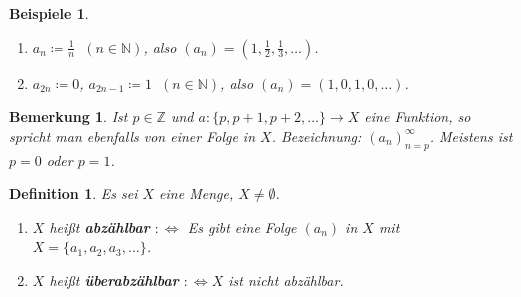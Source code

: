\documentclass[12pt]{extreport} %
\newcommand{\N}{\mathbb{N}}
\newcommand{\Z}{\mathbb{Z}}
\theoremstyle{named}
\theoremstyle{itshape}
\newtheorem*{definition}{Definition}
\theoremstyle{normal}
\newtheorem*{beispiele}{Beispiele}
\newtheorem*{bemerkung}{Bemerkung}
\begin{document}
\begin{beispiele} ~\
	\begin{enumerate}
		\item $a_{n} \coloneqq \frac{1}{n}$ $~(n \in \N)$, also $(a_{n}) = (1, \frac{1}{2}, \frac{1}{3}, \dotsc)$.
		\item $a_{2n} \coloneqq 0$, $a_{2n-1} \coloneqq 1$ $~(n \in \N)$, also $(a_{n}) = (1, 0, 1, 0, \dotsc)$.
	\end{enumerate}
\end{beispiele}


\begin{bemerkung}
	Ist $p \in \Z$ und $a \colon \{ p, p + 1, p+2, \dotsc \} \to X$ eine Funktion, so spricht man ebenfalls von einer Folge in $X$. Bezeichnung: $(a_{n})_{n = p}^{\infty}$. 
	Meistens ist $p = 0$ oder $p = 1$.
\end{bemerkung}

 
\begin{definition}
	Es sei $X$ eine Menge, $X \neq \emptyset$.
	\begin{enumerate}
		\item $X$ hei{\ss}t \textbf{abzählbar} $:\iff$ Es gibt eine Folge $(a_{n})$ in $X$ mit $X =\{ a_{1}, a_{2}, a_{3}, \dotsc \}$.
		\item $X$ hei{\ss}t \textbf{überabzählbar} $:\iff X$ ist nicht abzählbar.
	\end{enumerate}
\end{definition}
\end{document}
